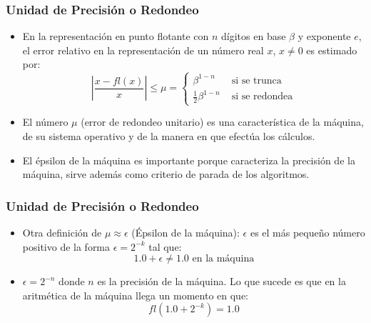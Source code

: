 \documentclass{beamer}
\begin{document}
\frame
{
  \frametitle{Unidad de Precisi\'on o Redondeo} 
  \begin{itemize}
    \item<1-> En la representaci\'on en punto flotante con $n$ d\'igitos en base $\beta$ y exponente $e$, el error relativo en la
    representaci\'on de un n\'umero real $x$, $x\neq0$ es estimado por:     
    $$
    \left|\frac{x-fl(x)}{x}\right|\leq \mu = \left\{\begin{array}{ll}
      \beta^{1-n} & \mbox{ si se trunca}\\
      \frac{1}{2}\beta^{1-n} & \mbox{ si se redondea}
      \end{array}
    \right.
    $$     
    \item<2->El n\'umero $\mu$ (error de redondeo unitario) es una caracter\'istica de la m\'aquina, de su sistema operativo y de la manera en que efect\'ua los c\'alculos. 
    \item<3-> El \'epsilon de la m\'aquina es importante porque caracteriza la precisi\'on de la m\'aquina, sirve adem\'as como criterio de parada de los algoritmos.
  \end{itemize}
}
\begin{frame}
  \frametitle{Unidad de Precisi\'on o Redondeo} 
  \begin{itemize}
    \item Otra definici\'on de $\mu \approx \epsilon$ (\'Epsilon de la m\'aquina): $\epsilon$ es el m\'as peque\~no n\'umero positivo de la forma $\epsilon = 2^{-k}$ tal que:
    $$
    1.0 + \epsilon \neq 1.0 \mbox{  en la m\'aquina}
    $$
    \item<2-> $\epsilon = 2^{-n}$ donde $n$ es la precisi\'on de la m\'aquina. Lo que sucede es que en la aritm\'etica de la m\'aquina llega un momento en que:    
    $$
    fl(1.0 + 2^{-k}) = 1.0
    $$    
  \end{itemize}
  \vspace{-0.5cm}
\end{frame}
\end{document}
